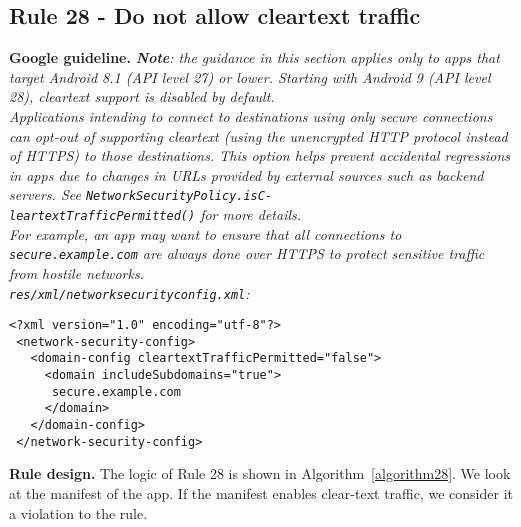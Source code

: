 \subsection{Rule 28 - Do not allow cleartext traffic} 
\textbf{Google guideline.} \emph{\textbf{Note}: the guidance in this section applies only to apps that target Android 8.1 (API level 27) or lower. Starting with Android 9 (API level 28), cleartext support is disabled by default.
\\
Applications intending to connect to destinations using only secure connections can opt-out of supporting cleartext (using the unencrypted HTTP protocol instead of HTTPS) to those destinations. This option helps prevent accidental regressions in apps due to changes in URLs provided by external sources such as backend servers. See \texttt{NetworkSecurityPolicy.isC-\\leartextTrafficPermitted()} for more details.
\\
For example, an app may want to ensure that all connections to \texttt{secure.example.com} are always done over HTTPS to protect sensitive traffic from hostile networks. 
\\
\texttt{res/xml/network\textunderscore security\textunderscore config.xml}:}
\begin{lstlisting}[language=XML_android, caption=Opt out of cleartext traffic, numbers=none]
 <?xml version="1.0" encoding="utf-8"?>
 <network-security-config>
   <domain-config cleartextTrafficPermitted="false">
     <domain includeSubdomains="true">
      secure.example.com
     </domain>
   </domain-config>
 </network-security-config>

\end{lstlisting}

\textbf{Rule design.} The logic of Rule 28 is shown in Algorithm~\ref{algorithm28}. We look at the manifest of the app. If the manifest enables clear-text traffic, we consider it a violation to the rule.

